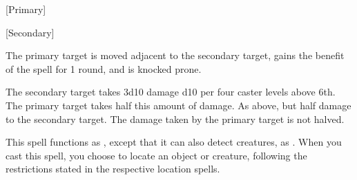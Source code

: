 \begin{spellheader}
    \spellrng{\rngclose}
    \begin{spelltargetinginfo}
        [Primary]
    \end{spelltargetinginfo}
    \begin{spelleffects}
        \begin{spelltargetinginfo}
            [Secondary]
        \end{spelltargetinginfo}
    \end{spelleffects}
\end{spellheader}
\begin{spellcontent}
    \spelleffect The primary target is moved adjacent to the secondary target, gains the benefit of the  spell for 1 round, and is knocked prone.
    \begin{spellmargin}
        \spellsuccess The secondary target takes 3d10 damage \add d10 per four caster levels above 6th. The primary target takes half this amount of damage.
        \spellfailure As above, but half damage to the secondary target. The damage taken by the primary target is not halved.
    \end{spellmargin}
\end{spellcontent}
\begin{spellfooter}

\end{spellfooter}

\begin{spellheader}
\end{spellheader}
\spellrng{\rngext}
\spelleffect This spell functions as , except that it can also detect creatures, as . When you cast this spell, you choose to locate an object or creature, following the restrictions stated in the respective location spells.

